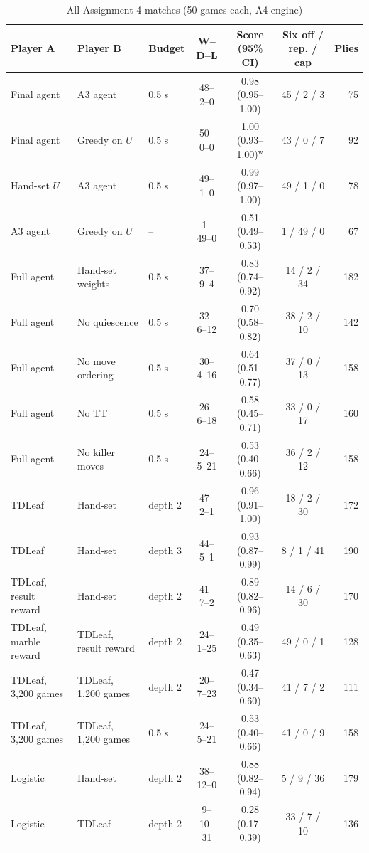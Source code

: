 \begin{table}[!htbp]
\centering\caption{All Assignment 4 matches (50 games each, A4 engine)}\label{tab:matches-a4}
\footnotesize
\begin{tabular}{@{}lllcccr@{}}
\toprule
Player A & Player B & Budget & W--D--L & Score (95\% CI) & Six off / rep. / cap & Plies \\
\midrule
Final agent & A3 agent & 0.5 s & 48--2--0 & 0.98 (0.95--1.00) & 45 / 2 / 3 & 75 \\
Final agent & Greedy on $U$ & 0.5 s & 50--0--0 & 1.00 (0.93--1.00)$^{\mathrm{w}}$ & 43 / 0 / 7 & 92 \\
Hand-set $U$ & A3 agent & 0.5 s & 49--1--0 & 0.99 (0.97--1.00) & 49 / 1 / 0 & 78 \\
A3 agent & Greedy on $U$ & -- & 1--49--0 & 0.51 (0.49--0.53) & 1 / 49 / 0 & 67 \\
\midrule
Full agent & Hand-set weights & 0.5 s & 37--9--4 & 0.83 (0.74--0.92) & 14 / 2 / 34 & 182 \\
Full agent & No quiescence & 0.5 s & 32--6--12 & 0.70 (0.58--0.82) & 38 / 2 / 10 & 142 \\
Full agent & No move ordering & 0.5 s & 30--4--16 & 0.64 (0.51--0.77) & 37 / 0 / 13 & 158 \\
Full agent & No TT & 0.5 s & 26--6--18 & 0.58 (0.45--0.71) & 33 / 0 / 17 & 160 \\
Full agent & No killer moves & 0.5 s & 24--5--21 & 0.53 (0.40--0.66) & 36 / 2 / 12 & 158 \\
\midrule
TDLeaf & Hand-set & depth 2 & 47--2--1 & 0.96 (0.91--1.00) & 18 / 2 / 30 & 172 \\
TDLeaf & Hand-set & depth 3 & 44--5--1 & 0.93 (0.87--0.99) & 8 / 1 / 41 & 190 \\
TDLeaf, result reward & Hand-set & depth 2 & 41--7--2 & 0.89 (0.82--0.96) & 14 / 6 / 30 & 170 \\
TDLeaf, marble reward & TDLeaf, result reward & depth 2 & 24--1--25 & 0.49 (0.35--0.63) & 49 / 0 / 1 & 128 \\
TDLeaf, 3,200 games & TDLeaf, 1,200 games & depth 2 & 20--7--23 & 0.47 (0.34--0.60) & 41 / 7 / 2 & 111 \\
TDLeaf, 3,200 games & TDLeaf, 1,200 games & 0.5 s & 24--5--21 & 0.53 (0.40--0.66) & 41 / 0 / 9 & 158 \\
\midrule
Logistic & Hand-set & depth 2 & 38--12--0 & 0.88 (0.82--0.94) & 5 / 9 / 36 & 179 \\
Logistic & TDLeaf & depth 2 & 9--10--31 & 0.28 (0.17--0.39) & 33 / 7 / 10 & 136 \\

\end{tabular}
\end{table}
